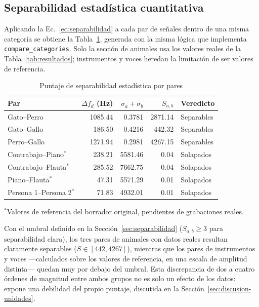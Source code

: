 \subsection{Separabilidad estadística cuantitativa}
\label{sec:resultados-separabilidad}

Aplicando la Ec.~\ref{eq:separabilidad} a cada par de señales dentro de una misma categoría se obtiene la Tabla~\ref{tab:separabilidad}, generada con la misma lógica que implementa \texttt{compare\_categories}. Solo la sección de animales usa los valores reales de la Tabla~\ref{tab:resultados}; instrumentos y voces heredan la limitación de ser valores de referencia.

\begin{table}[!t]
\centering
\caption{Puntaje de separabilidad estadística por pares}
\label{tab:separabilidad}
\small
\begin{tabular}{@{}l r r r l@{}}
\toprule
Par & $\Delta f_d$ (Hz) & $\sigma_a+\sigma_b$ & $S_{a,b}$ & Veredicto \\
\midrule

Gato--Perro & 1085.44 & 0.3781 & 2871.14 & Separables \\
Gato--Gallo & 186.50 & 0.4216 & 442.32 & Separables \\
Perro--Gallo & 1271.94 & 0.2981 & 4267.15 & Separables \\

\midrule

Contrabajo--Piano$^{*}$ & 238.21 & 5581.46 & 0.04 & Solapados \\
Contrabajo--Flauta$^{*}$ & 285.52 & 7662.75 & 0.04 & Solapados \\
Piano--Flauta$^{*}$ & 47.31 & 5571.29 & 0.01 & Solapados \\

\midrule

Persona 1--Persona 2$^{*}$ & 71.83 & 4932.01 & 0.01 & Solapados \\

\bottomrule
\end{tabular}

\vspace{2pt}
{\footnotesize $^{*}$Valores de referencia del borrador original, pendientes de grabaciones reales.}
\end{table}

Con el umbral definido en la Sección~\ref{sec:separabilidad} ($S_{a,b} \geq 3$ para separabilidad clara), los tres pares de animales con datos reales resultan claramente separables ($S \in [442, 4267]$), mientras que los pares de instrumentos y voces —calculados sobre los valores de referencia, en una escala de amplitud distinta— quedan muy por debajo del umbral. Esta discrepancia de dos a cuatro órdenes de magnitud entre ambos grupos no es solo un efecto de los datos: expone una debilidad del propio puntaje, discutida en la Sección~\ref{sec:discusion-unidades}.

